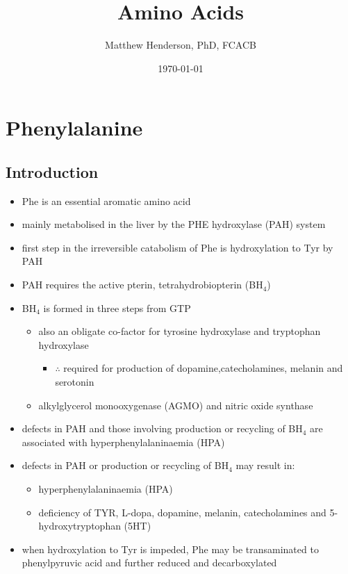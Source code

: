 \documentclass{scrartcl}
\author{Matthew Henderson, PhD, FCACB}
\date{\today}
\title{Amino Acids}
\begin{document}
\maketitle
\setcounter{tocdepth}{2}
\tableofcontents


\section{Phenylalanine}
\label{sec:org756cc53}
\subsection{Introduction}
\label{sec:orga12ef8a}
\begin{itemize}
\item Phe is an essential aromatic amino acid
\item mainly metabolised in the liver by the PHE hydroxylase (PAH) system
\item first step in the irreversible catabolism of Phe is hydroxylation to
Tyr by PAH
\item PAH requires the active pterin, tetrahydrobiopterin (BH\(_{\text{4}}\))
\item BH\(_{\text{4}}\) is formed in three steps from GTP
\begin{itemize}
\item also an obligate co-factor for tyrosine hydroxylase and tryptophan hydroxylase
\begin{itemize}
\item \(\therefore\) required for production of dopamine,catecholamines,
melanin and serotonin
\end{itemize}
\item alkylglycerol monooxygenase (AGMO) and nitric oxide synthase
\end{itemize}

\item defects in PAH and those involving production or recycling of BH\(_{\text{4}}\)
are associated with hyperphenylalaninaemia (HPA)
\item defects in PAH or production or recycling of BH\(_{\text{4}}\) may result in:
\begin{itemize}
\item hyperphenylalaninaemia (HPA)
\item deficiency of TYR, L-dopa, dopamine, melanin, catecholamines and 5-hydroxytryptophan (5HT)
\end{itemize}
\item when hydroxylation to Tyr is impeded, Phe may be transaminated to
phenylpyruvic acid and further reduced and decarboxylated
\end{itemize}
\end{document}
